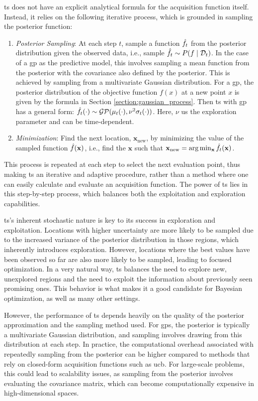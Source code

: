 \acf{ts} does not have an explicit analytical formula for the acquisition function itself. Instead, it relies on the following iterative process, which is grounded in sampling the posterior function:
\begin{enumerate}
    \item \textit{Posterior Sampling}: At each step $t$,  sample a function $\Hat{f}_t$ from the posterior distribution given the observed data, i.e., sample $\Hat{f}_t \sim P(f \mid \mathcal{D}_t)$. In the case of a \ac{gp} as the predictive model, this involves sampling a mean function from the posterior with the covariance also defined by the posterior. This is achieved by sampling from a multivariate Gaussian distribution. For a \ac{gp}, the posterior distribution of the objective function $f(x)$ at a new point $x$ is given by the formula in Section \ref{section:gaussian_process}. Then \ac{ts} with \ac{gp} has a general form: $\Hat{f}_t (\cdot) \sim \mathcal{GP}(\mu_t(\cdot), \nu^2 \sigma_t(\cdot))$. Here, $\nu$ us the exploration parameter and can be time-dependent. 
    
    \item \textit{Minimization}: Find the next location, $\mathbf{x}_{\text{new}}$, by minimizing the value of the sampled function $\Hat{f}(\mathbf{x})$, i.e., find the $\mathbf{x}$ such that $\mathbf{x}_{\text{new}} = \arg \min_\mathbf{x} \Hat{f}_t(\mathbf{x})$.
\end{enumerate}
This process is repeated at each step to select the next evaluation point, thus making \ac{ts} an iterative and adaptive procedure, rather than a method where one can easily calculate and evaluate an acquisition function. The power of \ac{ts} lies in this step-by-step process, which balances both the exploitation and exploration capabilities.

\ac{ts}’s inherent stochastic nature is key to its success in exploration and exploitation. Locations with higher uncertainty are more likely to be sampled due to the increased variance of the posterior distribution in those regions, which inherently introduces exploration. However, locations where the best values have been observed so far are also more likely to be sampled, leading to focused optimization. In a very natural way, \ac{ts} balances the need to explore new, unexplored regions and the need to exploit the information about previously seen promising ones. This behavior is what makes it a good candidate for Bayesian optimization, as well as many other settings.

However, the performance of \ac{ts} depends heavily on the quality of the posterior approximation and the sampling method used. For \acp{gp}, the posterior is typically a multivariate Gaussian distribution, and sampling involves drawing from this distribution at each step. In practice, the computational overhead associated with repeatedly sampling from the posterior can be higher compared to methods that rely on closed-form acquisition functions such as \ac{ucb}. For large-scale problems, this could lead to scalability issues, as sampling from the posterior involves evaluating the covariance matrix, which can become computationally expensive in high-dimensional spaces. 

